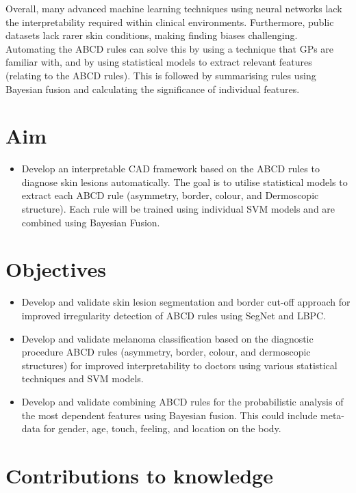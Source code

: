 Overall, many advanced machine learning techniques using neural networks lack the interpretability required within clinical environments. Furthermore, public datasets lack rarer skin conditions, making finding biases challenging. Automating the ABCD rules can solve this by using a technique that GPs are familiar with, and by using statistical models to extract relevant features (relating to the ABCD rules). This is followed by summarising rules using Bayesian fusion and calculating the significance of individual features.

\section{Aim}
\begin{itemize}
	\item Develop an interpretable CAD framework based on the ABCD rules to diagnose skin lesions automatically. The goal is to utilise statistical models to extract each ABCD rule (asymmetry, border, colour, and Dermoscopic structure). Each rule will be trained using individual SVM models and are combined using Bayesian Fusion.
\end{itemize}

\section{Objectives}
\begin{itemize}

	\item Develop and validate skin lesion segmentation and border cut-off approach for improved irregularity detection of ABCD rules using SegNet and LBPC.
	\item Develop and validate melanoma classification based on the diagnostic procedure ABCD rules (asymmetry, border, colour, and dermoscopic structures) for improved interpretability to doctors using various statistical techniques and SVM models.
	\item Develop and validate combining ABCD rules for the probabilistic analysis of the most dependent features using Bayesian fusion. This could include meta-data for gender, age, touch, feeling, and location on the body.

\end{itemize}

\section{Contributions to knowledge}
 
